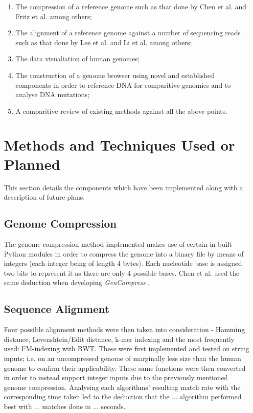 \documentclass{csfyp}
\begin{document}
\begin{enumerate}[nolistsep]

   \item The compression of a reference genome such as that done by Chen et al. \cite{gencompress} and Fritz et al. \cite{refcompression} among others;

  \item The alignment of a reference genome against a number of sequencing reads such as that done by Lee et al. \cite{cgreads} and Li et al. \cite{bwtransform} among others;

  \item The data visualiation of human genomes;

  \item The construction of a genome browser using novel and established components in order to reference DNA for comparitive genomics and to analyse DNA mutations;  

  \item A comparitive review of existing methods against all the above points.

\end{enumerate}


\section{Methods and Techniques Used or Planned}

This section details the components which have been implemented along with a description of future plans.

\subsection{Genome Compression}
The genome compression method implemented makes use of certain in-built Python modules in order to compress the genome into a binary file by means of integers (each integer being of length 4 bytes).  Each nucleotide base is assigned two bits to represent it as there are only 4 possible bases. Chen et al. used the same deduction when developing {\textit{GenCompress}} \cite{gencompress}.  

\subsection{Sequence Alignment}
Four possible alignment methods were then taken into consideration - Hamming distance, Levenshtein/Edit distance, k-mer indexing and the most frequently used: FM-indexing with BWT.  These were first implemented and tested on string inputs; i.e. on an uncompressed genome of marginally less size than the human genome to confirm their applicability.  These same functions were then converted in order to instead support integer inputs due to the previously mentioned genome compression.  Analysing each algorithms' resulting match rate with the corresponding time taken led to the deduction that the ... algorithm performed best with ... matches done in ... seconds.     
\end{document}
